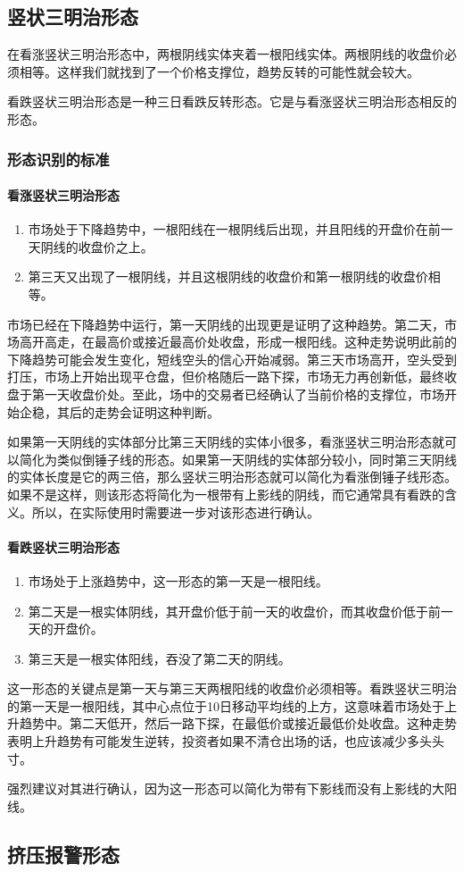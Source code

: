 \subsection{竖状三明治形态}
在看涨竖状三明治形态中，两根阴线实体夹着一根阳线实体。两根阴线的收盘价必须相等。这样我们就找到了一个价格支撑位，趋势反转的可能性就会较大。

看跌竖状三明治形态是一种三日看跌反转形态。它是与看涨竖状三明治形态相反的形态。
\subsubsection*{形态识别的标准}
\paragraph{看涨竖状三明治形态}
\begin{enumerate}
    \item 市场处于下降趋势中，一根阳线在一根阴线后出现，并且阳线的开盘价在前一天阴线的收盘价之上。
    \item 第三天又出现了一根阴线，并且这根阴线的收盘价和第一根阴线的收盘价相等。
\end{enumerate}

市场已经在下降趋势中运行，第一天阴线的出现更是证明了这种趋势。第二天，市场高开高走，在最高价或接近最高价处收盘，形成一根阳线。这种走势说明此前的下降趋势可能会发生变化，短线空头的信心开始减弱。第三天市场高开，空头受到打压，市场上开始出现平仓盘，但价格随后一路下探，市场无力再创新低，最终收盘于第一天收盘价处。至此，场中的交易者已经确认了当前价格的支撑位，市场开始企稳，其后的走势会证明这种判断。

如果第一天阴线的实体部分比第三天阴线的实体小很多，看涨竖状三明治形态就可以简化为类似倒锤子线的形态。如果第一天阴线的实体部分较小，同时第三天阴线的实体长度是它的两三倍，那么竖状三明治形态就可以简化为看涨倒锤子线形态。如果不是这样，则该形态将简化为一根带有上影线的阴线，而它通常具有看跌的含义。所以，在实际使用时需要进一步对该形态进行确认。

\paragraph{看跌竖状三明治形态}
\begin{enumerate}
    \item 市场处于上涨趋势中，这一形态的第一天是一根阳线。
    \item 第二天是一根实体阴线，其开盘价低于前一天的收盘价，而其收盘价低于前一天的开盘价。
    \item 第三天是一根实体阳线，吞没了第二天的阴线。
\end{enumerate}

这一形态的关键点是第一天与第三天两根阳线的收盘价必须相等。看跌竖状三明治的第一天是一根阳线，其中心点位于10日移动平均线的上方，这意味着市场处于上升趋势中。第二天低开，然后一路下探，在最低价或接近最低价处收盘。这种走势表明上升趋势有可能发生逆转，投资者如果不清仓出场的话，也应该减少多头头寸。

强烈建议对其进行确认，因为这一形态可以简化为带有下影线而没有上影线的大阳线。
\subsection{挤压报警形态}
\section{}